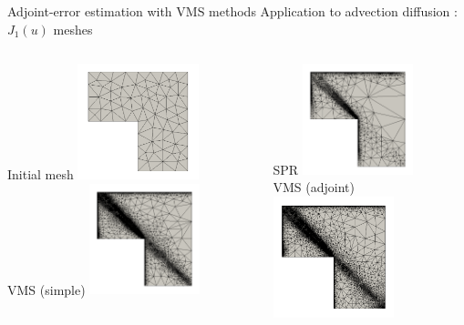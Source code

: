 \documentclass[fleqn]{beamer}
\begin{document}
\begin{frame}{Adjoint-error estimation with VMS methods}
{Application to advection diffusion : $J_1(u)$ meshes}

\begin{columns}
\begin{column}{3.2cm}
Initial mesh
\includegraphics[width=3.5cm]{../img/vms_lshape_global_initial.pdf} \\
VMS (simple)
\includegraphics[width=3.2cm]{../img/vms_lshape_global_vms1_final.pdf} 
\end{column}

\begin{column}{4cm}
SPR 
\includegraphics[width=3.2cm]{../img/vms_lshape_global_spr_final.pdf}\\
VMS (adjoint)\\
\includegraphics[width=3.5cm]{../img/vms_lshape_global_vms2_final.pdf}
\end{column}
\end{columns}

\end{frame}
\end{document}
